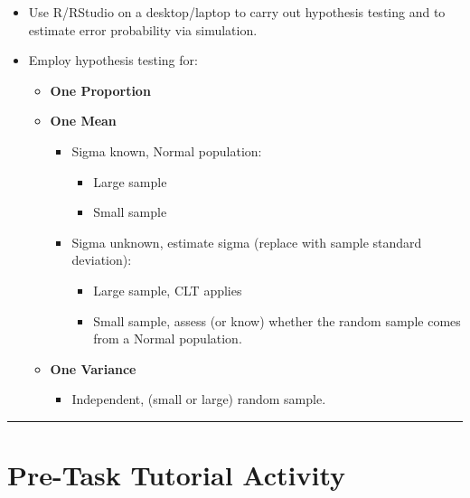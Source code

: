 \documentclass[oneside,openany]{book}
\providecommand{\tightlist}{%
  \setlength{\itemsep}{0pt}\setlength{\parskip}{0pt}}
\begin{document}
\begin{itemize}
\tightlist
\item
  Use R/RStudio on a desktop/laptop to carry out hypothesis testing and to estimate error probability via simulation.
\item
  Employ hypothesis testing for:

  \begin{itemize}
  \tightlist
  \item
    \textbf{One Proportion}
  \item
    \textbf{One Mean}

    \begin{itemize}
    \tightlist
    \item
      Sigma known, Normal population:

      \begin{itemize}
      \tightlist
      \item
        Large sample
      \item
        Small sample
      \end{itemize}
    \item
      Sigma unknown, estimate sigma (replace with sample standard deviation):

      \begin{itemize}
      \tightlist
      \item
        Large sample, CLT applies
      \item
        Small sample, assess (or know) whether the random sample comes from a Normal population.
      \end{itemize}
    \end{itemize}
  \item
    \textbf{One Variance}

    \begin{itemize}
    \tightlist
    \item
      Independent, (small or large) random sample.
    \end{itemize}
  \end{itemize}
\end{itemize}

\begin{center}\rule{0.5\linewidth}{0.5pt}\end{center}

\section{Pre-Task Tutorial Activity}\label{pre-task-tutorial-activity-2}
\end{document}

